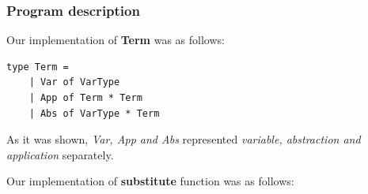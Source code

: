 \documentclass{article}
\begin{document}





\subsubsection*{Program description}

Our implementation of \textbf{Term} was as follows:

\begin{lstlisting}
type Term =
    | Var of VarType
    | App of Term * Term
    | Abs of VarType * Term
\end{lstlisting}

As it was shown, \emph{Var, App and Abs} represented \emph{variable, abstraction and application} separately.


Our implementation of \textbf{substitute} function was as follows:
\end{document}
